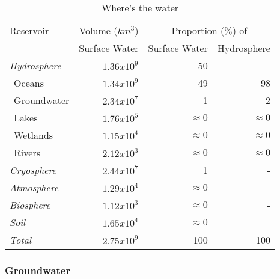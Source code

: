 \documentclass[amstex,12pt]{book}
\begin{document}
\begin{table} 
\label{tab:wtw}
\centering
\caption{Where's the water}
\begin{tabular}{@{}lrrr@{}} \toprule
Reservoir						&Volume ($km^{3}$)& \multicolumn{2}{c}{Proportion (\%) of}\\ \cmidrule(r){3-4}
										&Surface Water	&Surface Water &Hydrosphere 		\\  \midrule
\emph{Hydrosphere}	&$1.36x10^{9}$	&50			&- 			\\
$\ \ $Oceans				&$1.34x10^{9}$	&49			&98 		\\
$\ \ $Groundwater		&$2.34x10^{7}$	&1			&2 			\\
$\ \ $Lakes					&$1.76x10^{5}$	&$\approx 0$	&$\approx 0$ \\
$\ \ $Wetlands			&$1.15x10^{4}$	&$\approx 0$	&$\approx 0$ \\
$\ \ $Rivers				&$2.12x10^{3}$	&$\approx 0$	&$\approx 0$ \\
\emph{Cryosphere}		&$2.44x10^{7}$	&1			&- 			\\
\emph{Atmosphere}		&$1.29x10^{4}$	&$\approx 0$	&- 			\\
\emph{Biosphere}		&$1.12x10^{3}$	&$\approx 0$	&- 			\\
\emph{Soil}					&$1.65x10^{4}$	&$\approx 0$	&- 			\\
\emph{Total}				&$2.75x10^{9}$	&100		&100 		\\  \bottomrule
\end{tabular}
\end{table}


\subsubsection{Groundwater} 
\end{document}
